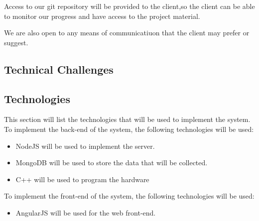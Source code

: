 \documentclass{scrartcl}
\begin{document}
Access to our git repository will be provided to the client,so the client can be able to monitor
our progress and have access to the project material.

We are also open to any means of communicatiuon that the client may prefer or suggest.

\subsection{Technical Challenges}
\subsection{Technologies}
This section will list the technologies that will be used to implement the system.\\
To implement the back-end of the system, the following technologies will be used:
\begin{itemize}
    \item NodeJS will be used to implement the server.
    \item MongoDB will be used to store the data that will be collected.
    \item C++ will be used to program the hardware
\end{itemize}
To implement the front-end of the system, the following technologies will be used:
\begin{itemize}
    \item AngularJS will be used for the web front-end.
\end{itemize}
\end{document}
